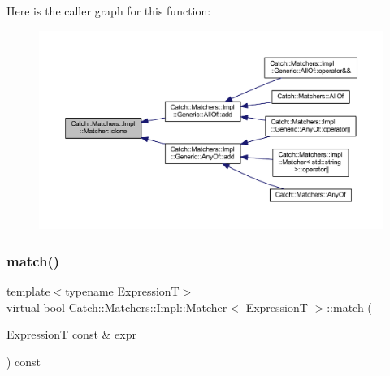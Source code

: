 Here is the caller graph for this function\+:\nopagebreak
\begin{figure}[H]
\begin{center}
\leavevmode
\includegraphics[width=350pt]{struct_catch_1_1_matchers_1_1_impl_1_1_matcher_a9d31e5018fea24efa08c3cbf5aa4475d_icgraph}
\end{center}
\end{figure}
\hypertarget{struct_catch_1_1_matchers_1_1_impl_1_1_matcher_a8c1c5511ce1f3738a45e6901b558f583}{}\label{struct_catch_1_1_matchers_1_1_impl_1_1_matcher_a8c1c5511ce1f3738a45e6901b558f583} 
\subsubsection{\texorpdfstring{match()}{match()}}
{\footnotesize\ttfamily template$<$typename ExpressionT$>$ \\
virtual bool \hyperlink{struct_catch_1_1_matchers_1_1_impl_1_1_matcher}{Catch\+::\+Matchers\+::\+Impl\+::\+Matcher}$<$ ExpressionT $>$\+::match (\begin{DoxyParamCaption}\item[{ExpressionT const \&}]{expr }\end{DoxyParamCaption}) const\hspace{0.3cm}{\ttfamily [pure virtual]}}



